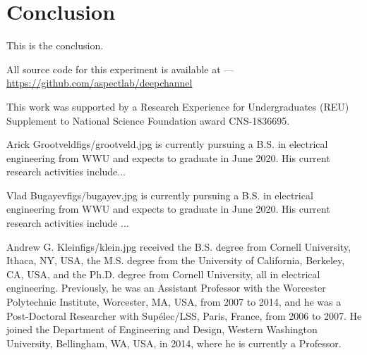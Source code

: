 \documentclass[twocolumn,letterpaper]{IEEEAerospaceCLS}  %
\begin{document}

\section{Conclusion}
\label{sec:conclusion}
This is the conclusion.



All source code for this experiment is available at ---\\
\url{https://github.com/aspectlab/deepchannel}




\acknowledgments
This work was supported by a Research Experience for Undergraduates
(REU) Supplement to National Science Foundation award CNS-1836695.


\newpage



\newpage
\thebiography
\begin{biographywithpic}
{Arick Grootveld}{figs/grootveld.jpg}
is currently pursuing a B.S. in electrical engineering from WWU and expects to graduate in June 2020. His current research activities include... 
\lipsum[1-1]
\end{biographywithpic}

\begin{biographywithpic}
{Vlad Bugayev}{figs/bugayev.jpg}
is currently pursuing a B.S. in electrical engineering from WWU and expects to graduate in June 2020. His current research activities include ...
\lipsum[1-1]
\end{biographywithpic}

\begin{biographywithpic}
{Andrew G. Klein}{figs/klein.jpg}
received the B.S. degree from Cornell University, Ithaca,
NY, USA, the M.S. degree from the University of
California, Berkeley, CA, USA, and the Ph.D.
degree from Cornell University, all in electrical
engineering. Previously, he was an Assistant Professor with the Worcester Polytechnic Institute,
Worcester, MA, USA, from 2007 to 2014, and he
was a Post-Doctoral Researcher with Sup\'{e}lec/LSS,
Paris, France, from 2006 to 2007. He joined the
Department of Engineering and Design, Western
Washington University, Bellingham, WA, USA, in 2014, where he is currently
a Professor.
\end{biographywithpic}
\end{document}
